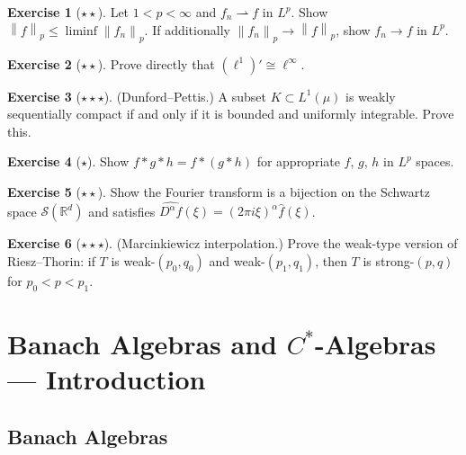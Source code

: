\documentclass[a4paper,12pt]{book}
\newcommand{\R}{\mathbb{R}}
\newcommand{\norm}[1]{\left\| #1 \right\|}
\newcommand{\weakto}{\rightharpoonup}
\theoremstyle{definition}
\newtheorem{exercise}{Exercise}[chapter]
\theoremstyle{plain}
\theoremstyle{remark}
\begin{document}
\begin{exercise}[$\star\star$]\label{exo:weak-Lp}
Let $1 < p < \infty$ and $f_n \weakto f$ in $L^p$. Show $\norm{f}_p \le \liminf \norm{f_n}_p$.
If additionally $\norm{f_n}_p \to \norm{f}_p$, show $f_n \to f$ in $L^p$.
\end{exercise}

\begin{exercise}[$\star\star$]\label{exo:dual-ell-1}
Prove directly that $(\ell^1)' \cong \ell^\infty$.
\end{exercise}

\begin{exercise}[$\star\star\star$]\label{exo:dunford-pettis}
(Dunford--Pettis.) A subset $K \subset L^1(\mu)$ is weakly sequentially compact
if and only if it is bounded and uniformly integrable. Prove this.
\end{exercise}

\begin{exercise}[$\star$]\label{exo:convolution-Lp}
Show $f * g * h = f * (g * h)$ for appropriate $f$, $g$, $h$ in $L^p$ spaces.
\end{exercise}

\begin{exercise}[$\star\star$]\label{exo:fourier-schwartz}
Show the Fourier transform is a bijection on the Schwartz space $\mathcal{S}(\R^d)$
and satisfies $\widehat{D^\alpha f}(\xi) = (2\pi i \xi)^\alpha \hat{f}(\xi)$.
\end{exercise}

\begin{exercise}[$\star\star\star$]\label{exo:marcinkiewicz}
(Marcinkiewicz interpolation.) Prove the weak-type version of Riesz--Thorin:
if $T$ is weak-$(p_0, q_0)$ and weak-$(p_1, q_1)$, then $T$ is strong-$(p, q)$
for $p_0 < p < p_1$.
\end{exercise}


\chapter{Banach Algebras and $C^*$-Algebras --- Introduction}
\label{ch:banach-cstar}
\minitoc

\section{Banach Algebras}\label{sec:banach-alg-def}
\end{document}
